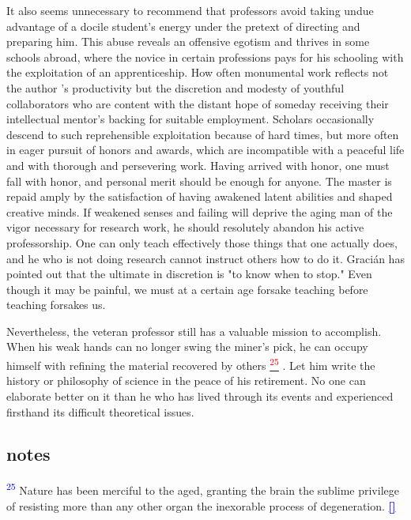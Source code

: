 \documentclass{article}
\newcommand{\noteref}[1]{%
 \hypertarget{ref:#1}{}%
 \hyperlink{note:#1}{\textsuperscript{\textcolor{red}{#1}}}%
}
\newcommand{\notetext}[2]{
 \par\noindent
 \hypertarget{note:#1}{\textsuperscript{\textcolor{blue}{#1}}} #2
 \hyperlink{ref:#1}{\textcolor{blue}{\textbf{[\textuparrow]}}}
 \par\vspace{1em}
}
\begin{document}
It also seems unnecessary to recommend that professors avoid taking undue advantage of a docile student’s energy under the pretext of directing and preparing him. This abuse reveals an offensive egotism and thrives in some schools abroad, where the novice in certain professions pays for his schooling with the exploitation of an apprenticeship. How often monumental work reflects not the author ’s productivity but the discretion and modesty of youthful collaborators who are content with the distant hope of someday receiving their intellectual mentor’s backing for suitable employment. Scholars occasionally descend to such reprehensible exploitation because of hard times, but more often in eager pursuit of honors and awards, which are incompatible with a peaceful life and with thorough and persevering work. Having arrived with honor, one must fall with honor, and personal merit should be enough for anyone. The master is repaid amply by the satisfaction of having awakened latent abilities and shaped creative minds. If weakened senses and failing will deprive the aging man of the vigor necessary for research work, he should resolutely abandon his active professorship. One can only teach effectively those things that one actually does, and he who is not doing research cannot instruct others how to do it. Gracián has pointed out that the ultimate in discretion is "to know when to stop." Even though it may be painful, we must at a certain age forsake teaching before teaching forsakes us.

Nevertheless, the veteran professor still has a valuable mission to accomplish. When his weak hands can no longer swing the miner’s pick, he can occupy himself with refining the material recovered by others\noteref{25}. Let him write the history or philosophy of science in the peace of his retirement. No one can elaborate better on it than he who has lived through its events and experienced firsthand its difficult theoretical issues.\\

\subsection*{notes}

\notetext{25}{Nature has been merciful to the aged, granting the brain the sublime privilege of resisting more than any other organ the inexorable process of degeneration.}
\end{document}
